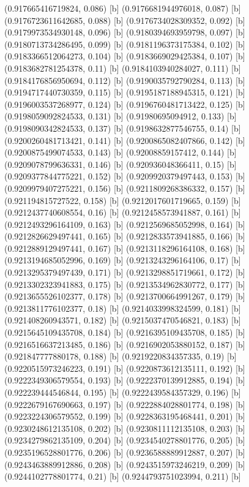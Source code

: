 {{{(0.917665416719824, 0.086) [b] 
(0.9176681944976018, 0.087) [b] 
(0.9176723611642685, 0.088) [b] 
(0.9176734028309352, 0.092) [b] 
(0.9179973534930148, 0.096) [b] 
(0.9180394693959798, 0.097) [b] 
(0.9180713734286495, 0.099) [b] 
(0.9181196373175384, 0.102) [b] 
(0.9183366512064273, 0.104) [b] 
(0.9183669029425384, 0.107) [b] 
(0.9183682781254378, 0.11) [b] 
(0.9184103940284027, 0.111) [b] 
(0.9184176856950694, 0.112) [b] 
(0.9190035792790284, 0.113) [b] 
(0.9194717440730359, 0.115) [b] 
(0.9195187188945315, 0.121) [b] 
(0.9196003537268977, 0.124) [b] 
(0.9196760481713422, 0.125) [b] 
(0.9198059092824533, 0.131) [b] 
(0.91980695094912, 0.133) [b] 
(0.9198090342824533, 0.137) [b] 
(0.9198632877546755, 0.14) [b] 
(0.9200260481713421, 0.141) [b] 
(0.9200865082407866, 0.142) [b] 
(0.9200875499074533, 0.143) [b] 
(0.92008859157412, 0.144) [b] 
(0.9209078799636331, 0.146) [b] 
(0.920936048366411, 0.15) [b] 
(0.9209377844775221, 0.152) [b] 
(0.9209920379497443, 0.153) [b] 
(0.9209979407275221, 0.156) [b] 
(0.9211809268386332, 0.157) [b] 
(0.921194815727522, 0.158) [b] 
(0.9212017601719665, 0.159) [b] 
(0.9212437740608554, 0.16) [b] 
(0.9212458573941887, 0.161) [b] 
(0.9212493296164109, 0.163) [b] 
(0.9212569685052998, 0.164) [b] 
(0.9212826629497441, 0.165) [b] 
(0.9212833573941885, 0.166) [b] 
(0.9212889129497441, 0.167) [b] 
(0.9213118296164108, 0.168) [b] 
(0.9213194685052996, 0.169) [b] 
(0.9213243296164106, 0.17) [b] 
(0.9213295379497439, 0.171) [b] 
(0.9213298851719661, 0.172) [b] 
(0.9213302323941883, 0.175) [b] 
(0.9213534962830772, 0.177) [b] 
(0.9213655526102377, 0.178) [b] 
(0.9213700664991267, 0.179) [b] 
(0.9213811776102377, 0.18) [b] 
(0.9214033998324599, 0.181) [b] 
(0.921408260943571, 0.182) [b] 
(0.9215037470546821, 0.183) [b] 
(0.9215645109435708, 0.184) [b] 
(0.9216395109435708, 0.185) [b] 
(0.9216516637213485, 0.186) [b] 
(0.9216902053880152, 0.187) [b] 
(0.921847777880178, 0.188) [b] 
(0.9219220834357335, 0.19) [b] 
(0.9220515973246223, 0.191) [b] 
(0.9220873612135111, 0.192) [b] 
(0.9222349306579554, 0.193) [b] 
(0.9222370139912885, 0.194) [b] 
(0.922239444546844, 0.195) [b] 
(0.9222439584357329, 0.196) [b] 
(0.9222679167690663, 0.197) [b] 
(0.9222884028801774, 0.198) [b] 
(0.9223224306579552, 0.199) [b] 
(0.9228363195468441, 0.201) [b] 
(0.9230248612135108, 0.202) [b] 
(0.9230811112135108, 0.203) [b] 
(0.9234279862135109, 0.204) [b] 
(0.9234540278801776, 0.205) [b] 
(0.9235196528801776, 0.206) [b] 
(0.9236588889912887, 0.207) [b] 
(0.9243463889912886, 0.208) [b] 
(0.9243515973246219, 0.209) [b] 
(0.9244102778801774, 0.21) [b] 
(0.9244793751023994, 0.211) [b] 
}}}
